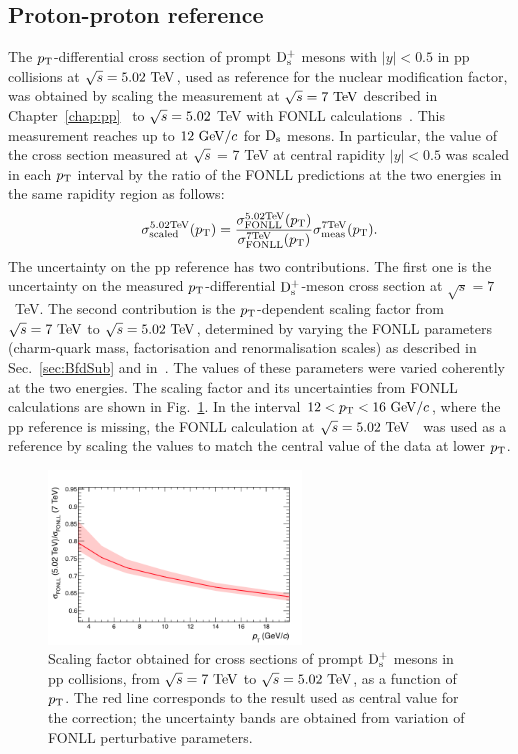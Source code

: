 \subsection{Proton-proton reference}
\label{sec:PPrefSyst}
The $p_{\rm T}$-differential cross section of prompt ${\rm D_s^+}$ mesons with 
$|y|<0.5$ in pp collisions at $\sqrt s=5.02~\mathrm{TeV}$, used as reference 
for the nuclear modification factor, was obtained by scaling the 
measurement at $\sqrt{s}=7~\mathrm{TeV}$ described in 
Chapter~\ref{chap:pp}~\cite{Acharya:2017jgo} to $\sqrt{s} = 5.02$ TeV 
with FONLL calculations~\cite{Cacciari:2012ny}. 
This measurement 
reaches up to $12~\mathrm{GeV}/c$ for ${\rm D_s}$ mesons.
In particular, the value of the cross section measured at $\sqrt{s}$ = 7 TeV 
at central rapidity $|y| < 0.5$ was scaled in each $p_{\rm T}$ interval by 
the ratio of the FONLL predictions at the two energies in the same rapidity region as follows:
\begin{equation}
\label{eq:scalingPP}
\sigma^{\rm 5.02 TeV}_{\rm scaled} (p_{\rm T}) = \frac{\sigma^{\rm 5.02 TeV}_{\rm FONLL} (p_{\rm T})}{\sigma^{\rm 7 TeV}_{\rm FONLL} (p_{\rm T})} \sigma^{\rm 7 TeV}_{\rm meas} (p_{\rm T}).
\end{equation}
The uncertainty on the pp reference 
has two contributions. The first one is the uncertainty on the measured 
$p_{\rm T}$-differential ${\rm D_s^+}$-meson cross section at $\sqrt s=7$~TeV.
The second contribution is the $p_{\rm T}$-dependent scaling factor 
from $\sqrt{s}=7~\mathrm{TeV}$ to $\sqrt{s}=5.02~\mathrm{TeV}$, determined by varying
the FONLL parameters (charm-quark mass, factorisation and renormalisation scales) 
as described in Sec.~\ref{sec:BfdSub} and in~\cite{Averbeck:2011ga}. The values of these parameters were 
varied coherently at the two energies. The scaling factor 
and its uncertainties from FONLL calculations are shown in Fig.~\ref{fig:FONLLscalFact}.
In the interval $12<p_{\rm T}<16~\mathrm{GeV}/c$, where the pp reference is missing, the FONLL calculation at 
$\sqrt s=5.02~\mathrm{TeV}$~\cite{Cacciari:2012ny} was used as a reference 
by scaling the values to match the central value of the data at lower $p_{\rm T}$. 
\begin{figure}[!h]
\centering
 \includegraphics[width=0.6\textwidth]{FigCap5/FONLLscaling7To5TeV.png}
 \caption{Scaling factor obtained for cross sections of prompt ${\rm D_s^+}$ mesons in pp collisions, from $\sqrt{s}=7~\mathrm{TeV}$ to $\sqrt{s}=5.02~\mathrm{TeV}$, as a function of $p_{\rm T}$. The red line corresponds to the result used as central value for the correction; the uncertainty bands are obtained from variation of FONLL perturbative parameters. }
 \label{fig:FONLLscalFact}
\end{figure}


